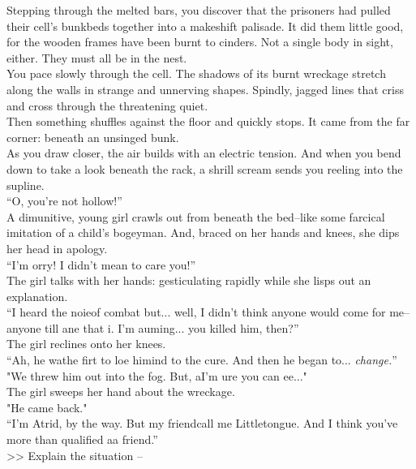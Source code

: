 Stepping through the melted bars, you discover that the prisoners had pulled their cell’s bunkbeds together into a makeshift palisade. It did them little good, for the wooden frames have been burnt to cinders. Not a single body in sight, either. They must all be in the nest.\\

You pace slowly through the cell. The shadows of its burnt wreckage stretch along the walls in strange and unnerving shapes. Spindly, jagged lines that criss and cross through the threatening quiet.\\

Then something shuffles against the floor and quickly stops. It came from the far corner: beneath an unsinged bunk.\\

As you draw closer, the air builds with an electric tension. And when you bend down to take a look beneath the rack, a shrill scream sends you reeling into the supline.\\

“O, you’re not hollow!”\\

A dimunitive, young girl crawls out from beneath the bed--like some farcical imitation of a child’s bogeyman. And, braced on her hands and knees, she dips her head in apology.\\

“I’m \lisp orry! I didn’t mean to \lisp care you!”\\

The girl talks with her hands: gesticulating rapidly while she lisps out an explanation.\\

“I heard the noi\lisp e\lispx of combat but... well, I didn’t think anyone would come for me--anyone \lisp till \lisp ane that i\lisp . I’m a\lisp uming... you killed him, then?”\\

The girl reclines onto her knees.\\
“Ah, he wa\lispx the fir\lisp t to lo\lisp e hi\lispx mind to the cur\lisp e. And then he began to... \emph{change.}”\\

"We threw him out into the fog. But, a\lispx I'm \lisp ure you can \lisp ee..."\\

The girl sweeps her hand about the wreckage.\\
"He came back."\\

“I’m A\lisp trid, by the way. But my friend\lispx call me Littletongue. And I think you’ve more than qualified a\lispx a friend.”\\

>> Explain the situation -- 